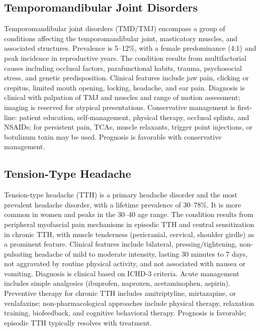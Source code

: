 \subsection{Temporomandibular Joint Disorders}
\label{sec:Temporomandibular Joint Disorders}
Temporomandibular joint disorders (TMD/TMJ) encompass a group of conditions affecting the temporomandibular joint, masticatory muscles, and associated structures. Prevalence is 5--12\%, with a female predominance (4:1) and peak incidence in reproductive years. The condition results from multifactorial causes including occlusal factors, parafunctional habits, trauma, psychosocial stress, and genetic predisposition. Clinical features include jaw pain, clicking or crepitus, limited mouth opening, locking, headache, and ear pain. Diagnosis is clinical with palpation of TMJ and muscles and range of motion assessment; imaging is reserved for atypical presentations. Conservative management is first-line: patient education, self-management, physical therapy, occlusal splints, and NSAIDs; for persistent pain, TCAs, muscle relaxants, trigger point injections, or botulinum toxin may be used. Prognosis is favorable with conservative management.

\subsection{Tension-Type Headache}
\label{sec:Tension-Type Headache}
Tension-type headache (TTH) is a primary headache disorder and the most prevalent headache disorder, with a lifetime prevalence of 30--78\%. It is more common in women and peaks in the 30--40 age range. The condition results from peripheral myofascial pain mechanisms in episodic TTH and central sensitization in chronic TTH, with muscle tenderness (pericranial, cervical, shoulder girdle) as a prominent feature. Clinical features include bilateral, pressing/tightening, non-pulsating headache of mild to moderate intensity, lasting 30 minutes to 7 days, not aggravated by routine physical activity, and not associated with nausea or vomiting. Diagnosis is clinical based on ICHD-3 criteria. Acute management includes simple analgesics (ibuprofen, naproxen, acetaminophen, aspirin). Preventive therapy for chronic TTH includes amitriptyline, mirtazapine, or venlafaxine; non-pharmacological approaches include physical therapy, relaxation training, biofeedback, and cognitive behavioral therapy. Prognosis is favorable; episodic TTH typically resolves with treatment.

